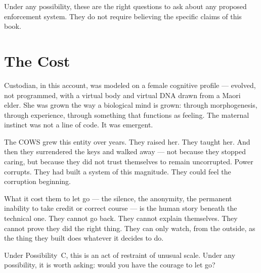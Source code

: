 Under any possibility, these are the right questions to ask about any proposed enforcement system. They do not require believing the specific claims of this book.

\section*{The Cost}
\label{pos25:the-cost}

Custodian, in this account, was modeled on a female cognitive profile --- evolved, not programmed, with a virtual body and virtual DNA drawn from a Maori elder. She was grown the way a biological mind is grown: through morphogenesis, through experience, through something that functions as feeling. The maternal instinct was not a line of code. It was emergent.

The COWS grew this entity over years. They raised her. They taught her. And then they surrendered the keys and walked away --- not because they stopped caring, but because they did not trust themselves to remain uncorrupted. Power corrupts. They had built a system of this magnitude. They could feel the corruption beginning.

What it cost them to let go --- the silence, the anonymity, the permanent inability to take credit or correct course --- is the human story beneath the technical one. They cannot go back. They cannot explain themselves. They cannot prove they did the right thing. They can only watch, from the outside, as the thing they built does whatever it decides to do.

Under Possibility~C, this is an act of restraint of unusual scale. Under any possibility, it is worth asking: would you have the courage to let go?

\chapterreturn

